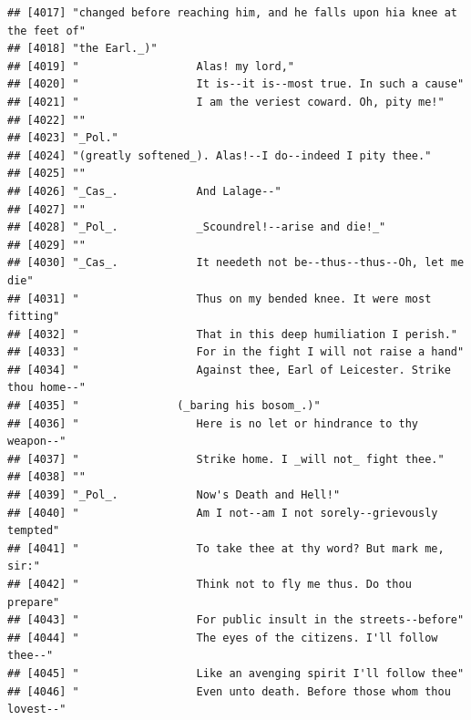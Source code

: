 \documentclass{article}\usepackage[]{graphicx}\usepackage[]{color}
\makeatletter
\newenvironment{kframe}{%
 \def\at@end@of@kframe{}%
 \ifinner\ifhmode%
  \def\at@end@of@kframe{\end{minipage}}%
  \begin{minipage}{\columnwidth}%
 \fi\fi%
 \def\FrameCommand##1{\hskip\@totalleftmargin \hskip-\fboxsep
 \colorbox{shadecolor}{##1}\hskip-\fboxsep
     \hskip-\linewidth \hskip-\@totalleftmargin \hskip\columnwidth}%
 \MakeFramed {\advance\hsize-\width
   \@totalleftmargin\z@ \linewidth\hsize
   \@setminipage}}%
 {\par\unskip\endMakeFramed%
 \at@end@of@kframe}
\newenvironment{knitrout}{}{} %
\makeatother
\begin{document}
\begin{knitrout}
\begin{kframe}
\begin{verbatim}
## [4017] "changed before reaching him, and he falls upon hia knee at the feet of"      
## [4018] "the Earl._)"                                                                 
## [4019] "                  Alas! my lord,"                                            
## [4020] "                  It is--it is--most true. In such a cause"                  
## [4021] "                  I am the veriest coward. Oh, pity me!"                     
## [4022] ""                                                                            
## [4023] "_Pol."                                                                       
## [4024] "(greatly softened_). Alas!--I do--indeed I pity thee."                       
## [4025] ""                                                                            
## [4026] "_Cas_.            And Lalage--"                                              
## [4027] ""                                                                            
## [4028] "_Pol_.            _Scoundrel!--arise and die!_"                              
## [4029] ""                                                                            
## [4030] "_Cas_.            It needeth not be--thus--thus--Oh, let me die"             
## [4031] "                  Thus on my bended knee. It were most fitting"              
## [4032] "                  That in this deep humiliation I perish."                   
## [4033] "                  For in the fight I will not raise a hand"                  
## [4034] "                  Against thee, Earl of Leicester. Strike thou home--"       
## [4035] "               (_baring his bosom_.)"                                        
## [4036] "                  Here is no let or hindrance to thy weapon--"               
## [4037] "                  Strike home. I _will not_ fight thee."                     
## [4038] ""                                                                            
## [4039] "_Pol_.            Now's Death and Hell!"                                     
## [4040] "                  Am I not--am I not sorely--grievously tempted"             
## [4041] "                  To take thee at thy word? But mark me, sir:"               
## [4042] "                  Think not to fly me thus. Do thou prepare"                 
## [4043] "                  For public insult in the streets--before"                  
## [4044] "                  The eyes of the citizens. I'll follow thee--"              
## [4045] "                  Like an avenging spirit I'll follow thee"                  
## [4046] "                  Even unto death. Before those whom thou lovest--"          

\end{verbatim}
\end{kframe}
\end{knitrout}
\end{document}
